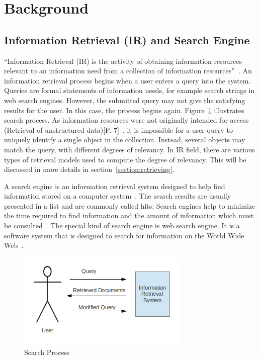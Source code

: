 
\section{Background}\label{section:background}

\subsection{Information Retrieval (IR) and Search Engine}\label{section:IR}
``Information Retrieval (IR) is the activity of obtaining information resources relevant to an information need from a collection of information resources''~\cite{IR}. 
An information retrieval process begins when a user 
enters a query into the system. Queries are formal statements of information needs, for example search strings in web search engines. However, the 
submitted query may not give the satisfying results for the user. In this case, the process begins again. Figure~\ref{fig:retrieval_process} illustrates
search process. As information resources were not originally intended for access (Retrieval of unstructured data)[P. 7]~\cite{IRlecture}. 
it is impossible for a user query to uniquely identify a single object in the collection. Instead, several objects may match the query, 
with different degrees of relevancy. In IR field, there are various types of retrieval models used to compute the degree of relevancy. This will
be discussed in more details in section~\ref{section:retrieving}.

A search engine is an information retrieval system designed to help find information stored on a computer system~\cite{searchengine}. The search results are usually 
presented in a list and are commonly called hits. Search engines help to minimize the time required to find information and the amount of 
information which must be consulted~\cite{searchengine}. The special kind of search engine is 
web search engine. It is a software system that is designed to search for information on the World Wide Web~\cite{websearchengine}.

\begin{figure}
\centering
\includegraphics[scale=1]{./figures/retrieval_process.png}
\caption{Search Process} \label{fig:retrieval_process}
\end{figure}

